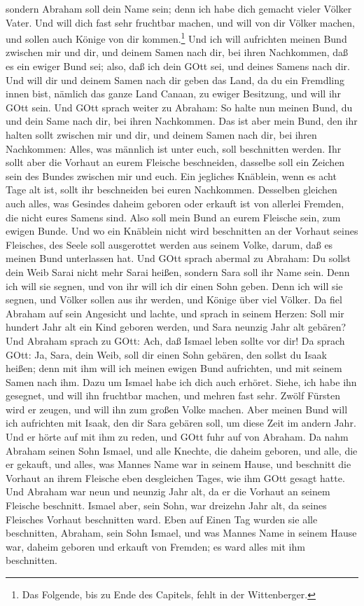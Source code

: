 \begin{schriftzitat}
sondern Abraham soll dein Name sein; denn ich habe dich gemacht vieler Völker Vater. Und will dich fast sehr fruchtbar machen, und will von dir Völker machen, und sollen auch Könige von dir kommen.\footnote{Das Folgende, bis zu Ende des Capitels, fehlt in der Wittenberger.} Und ich will aufrichten meinen Bund zwischen mir und dir, und deinem Samen nach dir, bei ihren Nachkommen, daß es ein ewiger Bund sei; also, daß ich dein GOtt sei, und deines Samens nach dir. Und will dir und deinem Samen nach dir geben das Land, da du ein Fremdling innen bist, nämlich das ganze Land Canaan,
zu ewiger Besitzung, und will ihr GOtt sein. Und GOtt sprach weiter zu Abraham: So halte nun meinen Bund, du und dein Same nach dir, bei ihren Nachkommen. Das ist aber mein Bund, den ihr halten sollt zwischen mir und dir, und deinem Samen nach dir, bei ihren Nachkommen: Alles, was männlich ist unter euch, soll beschnitten werden. Ihr sollt aber die Vorhaut an eurem Fleische beschneiden, dasselbe soll ein Zeichen sein des Bundes zwischen mir und euch. Ein jegliches Knäblein, wenn es acht Tage alt ist, sollt ihr beschneiden bei euren Nachkommen. Desselben gleichen auch alles, was Gesindes daheim geboren oder erkauft ist von allerlei Fremden, die nicht eures Samens sind. Also soll mein Bund an eurem Fleische sein, zum ewigen Bunde. Und wo ein Knäblein nicht wird beschnitten an der Vorhaut seines Fleisches, des Seele soll ausgerottet werden aus seinem Volke, darum, daß es meinen Bund unterlassen hat. Und GOtt sprach abermal zu Abraham: Du sollst dein Weib Sarai nicht mehr Sarai heißen, sondern Sara soll ihr Name sein. Denn ich will sie segnen, und von ihr will ich dir einen Sohn geben. Denn ich will sie segnen, und Völker sollen aus ihr werden, und Könige über viel Völker. Da fiel Abraham auf sein Angesicht und lachte, und sprach in seinem Herzen: Soll mir hundert Jahr alt ein Kind geboren werden, und Sara neunzig Jahr alt gebären? Und Abraham sprach zu GOtt: Ach, daß Ismael leben sollte vor dir! Da sprach GOtt: Ja, Sara, dein Weib, soll dir einen Sohn gebären, den sollst du Isaak heißen; denn mit ihm will ich meinen ewigen Bund aufrichten, und mit seinem Samen nach ihm. Dazu um Ismael habe ich dich auch erhöret. Siehe, ich habe ihn gesegnet, und will ihn fruchtbar machen, und mehren fast sehr. Zwölf Fürsten wird er zeugen, und will ihn zum großen Volke machen. Aber meinen Bund will ich aufrichten mit Isaak, den dir Sara gebären soll, um diese Zeit im andern Jahr. Und er hörte auf mit ihm zu reden, und GOtt fuhr auf von Abraham. Da nahm Abraham seinen Sohn Ismael, und alle Knechte, die daheim geboren, und alle, die er gekauft, und alles, was Mannes Name war in seinem Hause, und beschnitt die Vorhaut an ihrem Fleische eben desgleichen Tages, wie ihm GOtt gesagt hatte. Und Abraham war neun und neunzig Jahr alt, da er die Vorhaut an seinem Fleische beschnitt. Ismael aber, sein Sohn, war dreizehn Jahr alt, da seines Fleisches Vorhaut beschnitten ward. Eben auf Einen Tag wurden sie alle beschnitten, Abraham, sein Sohn Ismael, und was Mannes Name in seinem Hause war, daheim geboren und erkauft von Fremden; es ward alles mit ihm beschnitten.
\end{schriftzitat}

